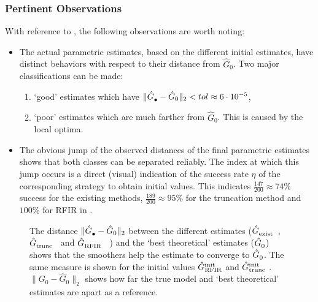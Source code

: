 \subsubsection{Pertinent Observations}
With reference to , the following observations are worth noting: 
\begin{itemize}
\item The actual parametric estimates, based on the different initial estimates, have distinct behaviors with respect to their distance from $\hat{G}_{0}$.
Two major classifications can be made:
\begin{enumerate}
  \item `good' estimates which have $\|\model{\bullet} - \hat{G}_{0} \|_2 < tol \approx 6 \cdot 10^{-5}$,
  \item `poor' estimates which are much farther from $\hat{G}_{0}$.  This is caused by the local optima.
\end{enumerate}
\item
The obvious jump of the observed distances of the final parametric estimates shows that both classes can be separated reliably.
The index at which this jump occurs is a direct (visual) indication of the success rate $\eta$ of the corresponding strategy to obtain initial values.
This indicates $\frac{147}{200} \approx 74\%$ success for the existing methods, $\frac{189}{200} \approx 95\%$ for the truncation method and $100\%$ for RFIR in .
\end{itemize}

\begin{figure}
  \centering
  \setlength{\figurewidth}{0.8\columnwidth}
  \setlength{\figureheight}{0.6\figurewidth}
  
 \caption[Model error for different initialization schemes on simulations.]{The distance $\|\model{\bullet} - \hat{G}_0 \|_2$  between the different estimates ($\model{exist}$~, $\model{trunc}$~ and $\model{RFIR}$~ ) and the `best theoretical' estimates ($\model{0}$) shows that the smoothers help the estimate to converge to $\model{0}$.
 The same measure is shown for the initial values $\model[init]{RFIR}$  and $\model[init]{trunc}$ .
 $\|{G}_{0} - \hat{G}_0\|_2$ shows how far the true model and `best theoretical' estimates are apart as a reference. }
  \label{fig:single-sim}
\end{figure}

